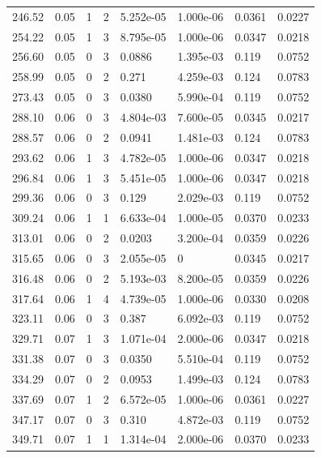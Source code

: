 \documentclass[preview]{standalone}
\begin{document}
{{{\begin{tabular}{L{1.2cm}C{1.2cm} C{0.3cm}C{0.5cm} C{1.4cm}C{1.4cm} C{1.4cm}C{1.4cm}}
  246.52  &  0.05  & 1     &  2 &  5.252e-05  & 1.000e-06  & 0.0361 &  0.0227   \\ 
  254.22  &  0.05  & 1     &  3 &  8.795e-05  & 1.000e-06  & 0.0347 &  0.0218   \\ 
  256.60  &  0.05  & 0     &  3 &  0.0886  & 1.395e-03  & 0.119 &  0.0752   \\ 
  258.99  &  0.05  & 0     &  2 &  0.271  & 4.259e-03  & 0.124 &  0.0783   \\ 
  273.43  &  0.05  & 0     &  3 &  0.0380  & 5.990e-04  & 0.119 &  0.0752   \\ 
  288.10  &  0.06  & 0     &  3 &  4.804e-03  & 7.600e-05  & 0.0345 &  0.0217   \\ 
  288.57  &  0.06  & 0     &  2 &  0.0941  & 1.481e-03  & 0.124 &  0.0783   \\ 
  293.62  &  0.06  & 1     &  3 &  4.782e-05  & 1.000e-06  & 0.0347 &  0.0218   \\ 
  296.84  &  0.06  & 1     &  3 &  5.451e-05  & 1.000e-06  & 0.0347 &  0.0218   \\ 
  299.36  &  0.06  & 0     &  3 &  0.129  & 2.029e-03  & 0.119 &  0.0752   \\ 
  309.24  &  0.06  & 1     &  1 &  6.633e-04  & 1.000e-05  & 0.0370 &  0.0233   \\ 
  313.01  &  0.06  & 0     &  2 &  0.0203  & 3.200e-04  & 0.0359 &  0.0226   \\ 
  315.65  &  0.06  & 0     &  3 &  2.055e-05  & 0  & 0.0345 &  0.0217   \\ 
  316.48  &  0.06  & 0     &  2 &  5.193e-03  & 8.200e-05  & 0.0359 &  0.0226   \\ 
  317.64  &  0.06  & 1     &  4 &  4.739e-05  & 1.000e-06  & 0.0330 &  0.0208   \\ 
  323.11  &  0.06  & 0     &  3 &  0.387  & 6.092e-03  & 0.119 &  0.0752   \\ 
  329.71  &  0.07  & 1     &  3 &  1.071e-04  & 2.000e-06  & 0.0347 &  0.0218   \\ 
  331.38  &  0.07  & 0     &  3 &  0.0350  & 5.510e-04  & 0.119 &  0.0752   \\ 
  334.29  &  0.07  & 0     &  2 &  0.0953  & 1.499e-03  & 0.124 &  0.0783   \\ 
  337.69  &  0.07  & 1     &  2 &  6.572e-05  & 1.000e-06  & 0.0361 &  0.0227   \\ 
  347.17  &  0.07  & 0     &  3 &  0.310  & 4.872e-03  & 0.119 &  0.0752   \\ 
  349.71  &  0.07  & 1     &  1 &  1.314e-04  & 2.000e-06  & 0.0370 &  0.0233   \\ 

\end{tabular}}}}
\end{document}
